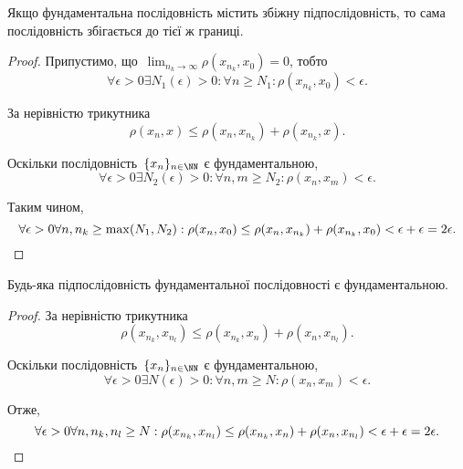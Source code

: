\begin{lemma}
Якщо фундаментальна послідовність містить
збіжну підпослідовність, то сама послідовність збігається
до тієї ж границі.
\end{lemma}

\begin{proof}
Припустимо, що~$\lim_{n_k \to \infty} \rho(x_{n_k}, x_0) = 0$, тобто
\begin{equation*}
    \forall \epsilon > 0 \exists N_1(\epsilon) > 0: \forall n \ge N_1: \rho(x_{n_k}, x_0) < \epsilon.
\end{equation*}

За нерівністю трикутника
\begin{equation*}
    \rho(x_n, x) \le \rho(x_n, x_{n_k}) + \rho(x_{n_k}, x).
\end{equation*}

Оскільки послідовність~$\{x_n\}_{n \in \NN}$ є фундаментальною,
\begin{equation*}
    \forall \epsilon > 0 \exists N_2(\epsilon) > 0: \forall n, m \ge N_2: \rho(x_n, x_m) < \epsilon.
\end{equation*}

Таким чином,
\begin{equation*}
    \forall \epsilon > 0 \forall n, n_k \ge \max(N_1, N_2):
    \rho(x_n, x_0) \le \rho(x_n, x_{n_k}) + \rho(x_{n_k}, x_0) <
    \epsilon + \epsilon = 2 \epsilon. \qedhere
\end{equation*}
\end{proof}

\begin{lemma}
Будь-яка підпослідовність фундаментальної
послідовності є фундаментальною.
\end{lemma}

\begin{proof}
За нерівністю трикутника
\begin{equation*}
    \rho(x_{n_k}, x_{n_l}) \le \rho(x_{n_k}, x_n) + \rho(x_n, x_{n_l}).
\end{equation*}

Оскільки послідовність~$\{x_n\}_{n \in \NN}$ є фундаментальною,
\begin{equation*}
    \forall \epsilon > 0 \exists N(\epsilon) > 0: \forall n, m \ge N: \rho(x_n, x_m) < \epsilon.
\end{equation*}

Отже,
\begin{equation*}
    \forall \epsilon > 0 \forall n, n_k, n_l \ge N:
    \rho(x_{n_k}, x_{n_l}) \le \rho(x_{n_k}, x_n) + \rho(x_n, x_{n_l})
    < \epsilon + \epsilon = 2 \epsilon. \qedhere
\end{equation*}
\end{proof}

